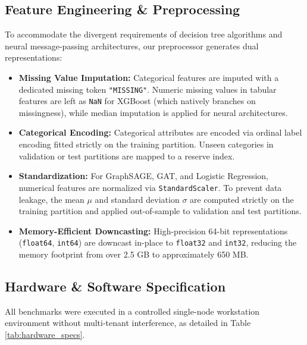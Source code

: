 \documentclass[11pt,a4paper]{report}
\begin{document}
\subsection{Feature Engineering \& Preprocessing}
To accommodate the divergent requirements of decision tree algorithms and neural message-passing architectures, our preprocessor generates dual representations:
\begin{itemize}
    \item \textbf{Missing Value Imputation:} Categorical features are imputed with a dedicated missing token \texttt{"MISSING"}. Numeric missing values in tabular features are left as \texttt{NaN} for XGBoost (which natively branches on missingness), while median imputation is applied for neural architectures.
    \item \textbf{Categorical Encoding:} Categorical attributes are encoded via ordinal label encoding fitted strictly on the training partition. Unseen categories in validation or test partitions are mapped to a reserve index.
    \item \textbf{Standardization:} For GraphSAGE, GAT, and Logistic Regression, numerical features are normalized via \texttt{StandardScaler}. To prevent data leakage, the mean $\mu$ and standard deviation $\sigma$ are computed strictly on the training partition and applied out-of-sample to validation and test partitions.
    \item \textbf{Memory-Efficient Downcasting:} High-precision 64-bit representations (\texttt{float64}, \texttt{int64}) are downcast in-place to \texttt{float32} and \texttt{int32}, reducing the memory footprint from over 2.5 GB to approximately 650 MB.
\end{itemize}

\subsection{Hardware \& Software Specification}
All benchmarks were executed in a controlled single-node workstation environment without multi-tenant interference, as detailed in Table \ref{tab:hardware_specs}.
\end{document}
